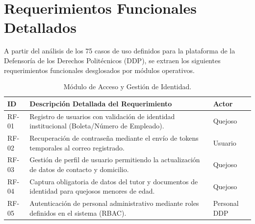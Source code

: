 \section{Requerimientos Funcionales Detallados}

A partir del análisis de los 75 casos de uso definidos para la plataforma de la Defensoría de los Derechos Politécnicos (DDP), se extraen los siguientes requerimientos funcionales desglosados por módulos operativos.

\begin{table}[h!]
\centering
\scriptsize
\caption{Módulo de Acceso y Gestión de Identidad.}
\label{tab:rf_acceso}
\begin{tabular}{@{} l p{9.5cm} l @{}}
\toprule
\rowcolor[HTML]{2D3E50} 
\textbf{\color[HTML]{FFFFFF} ID} & \textbf{\color[HTML]{FFFFFF} Descripción Detallada del Requerimiento} & \textbf{\color[HTML]{FFFFFF} Actor} \\ \midrule
RF-01 & Registro de usuarios con validación de identidad institucional (Boleta/Número de Empleado). & Quejoso \\
\rowcolor[HTML]{F2F4F7} 
RF-02 & Recuperación de contraseña mediante el envío de tokens temporales al correo registrado. & Usuario \\
RF-03 & Gestión de perfil de usuario permitiendo la actualización de datos de contacto y domicilio. & Quejoso \\
\rowcolor[HTML]{F2F4F7} 
RF-04 & Captura obligatoria de datos del tutor y documentos de identidad para quejosos menores de edad. & Quejoso \\
RF-05 & Autenticación de personal administrativo mediante roles definidos en el sistema (RBAC). & Personal DDP \\ \bottomrule
\end{tabular}
\end{table}

